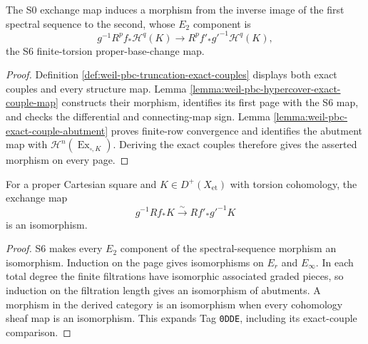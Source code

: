 \begin{lemma}
\label{lemma:weil-pbc-hypercohomology-map}
The S0 exchange map induces a morphism from the inverse image of the first
spectral sequence to the second, whose $E_2$ component is
\[
 g^{-1}R^pf_*\mathcal H^q(K)\longrightarrow
 R^pf'_*g'^{-1}\mathcal H^q(K),
\]
the S6 finite-torsion proper-base-change map.
\end{lemma}
\begin{proof}

Definition \ref{def:weil-pbc-truncation-exact-couples} displays both exact
couples and every structure map.  Lemma
\ref{lemma:weil-pbc-hypercover-exact-couple-map} constructs their morphism,
identifies its first page with the S6 map, and checks the differential and
connecting-map sign.  Lemma \ref{lemma:weil-pbc-exact-couple-abutment}
proves finite-row convergence and identifies the abutment map with
$\mathcal H^n(\operatorname{Ex}_{\square,K})$.  Deriving the exact couples
therefore gives the asserted morphism on every page.
\end{proof}

\begin{proposition}
\label{prop:weil-proet-finite-derived-proper-base-change}
\uses{}

For a proper Cartesian square and $K\in D^+(X_{\mathrm{et}})$ with torsion
cohomology, the exchange map
\[
 g^{-1}Rf_*K\xrightarrow{\sim}Rf'_*g'^{-1}K
\]
is an isomorphism.
\end{proposition}
\begin{proof}

S6 makes every $E_2$ component of the spectral-sequence morphism an
isomorphism.  Induction on the page gives isomorphisms on $E_r$ and
$E_\infty$.  In each total degree the finite filtrations have isomorphic
associated graded pieces, so induction on the filtration length gives an
isomorphism of abutments.  A morphism in the derived category is an
isomorphism when every cohomology sheaf map is an isomorphism.  This expands
Tag \texttt{0DDE}, including its exact-couple comparison.
\end{proof}

